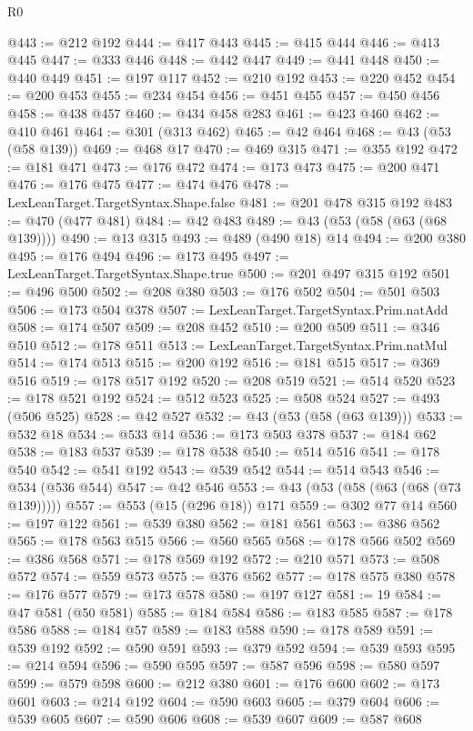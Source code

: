 \begin{lexlean}{R0}
\begin{coremodule}
@443 := @212 @192
@444 := @417 @443
@445 := @415 @444
@446 := @413 @445
@447 := @333 @446
@448 := @442 @447
@449 := @441 @448
@450 := @440 @449
@451 := @197 @117
@452 := @210 @192
@453 := @220 @452
@454 := @200 @453
@455 := @234 @454
@456 := @451 @455
@457 := @450 @456
@458 := @438 @457
@460 := @434 @458 @283
@461 := @423 @460
@462 := @410 @461
@464 := @301 (@313 @462)
@465 := @42 @464
@468 := @43 (@53 (@58 @139))
@469 := @468 @17
@470 := @469 @315
@471 := @355 @192
@472 := @181 @471
@473 := @176 @472
@474 := @173 @473
@475 := @200 @471
@476 := @176 @475
@477 := @474 @476
@478 := LexLeanTarget.TargetSyntax.Shape.false
@481 := @201 @478 @315 @192
@483 := @470 (@477 @481)
@484 := @42 @483
@489 := @43 (@53 (@58 (@63 (@68 @139))))
@490 := @13 @315
@493 := @489 (@490 @18) @14
@494 := @200 @380
@495 := @176 @494
@496 := @173 @495
@497 := LexLeanTarget.TargetSyntax.Shape.true
@500 := @201 @497 @315 @192
@501 := @496 @500
@502 := @208 @380
@503 := @176 @502
@504 := @501 @503
@506 := @173 @504 @378
@507 := LexLeanTarget.TargetSyntax.Prim.natAdd
@508 := @174 @507
@509 := @208 @452
@510 := @200 @509
@511 := @346 @510
@512 := @178 @511
@513 := LexLeanTarget.TargetSyntax.Prim.natMul
@514 := @174 @513
@515 := @200 @192
@516 := @181 @515
@517 := @369 @516
@519 := @178 @517 @192
@520 := @208 @519
@521 := @514 @520
@523 := @178 @521 @192
@524 := @512 @523
@525 := @508 @524
@527 := @493 (@506 @525)
@528 := @42 @527
@532 := @43 (@53 (@58 (@63 @139)))
@533 := @532 @18
@534 := @533 @14
@536 := @173 @503 @378
@537 := @184 @62
@538 := @183 @537
@539 := @178 @538
@540 := @514 @516
@541 := @178 @540
@542 := @541 @192
@543 := @539 @542
@544 := @514 @543
@546 := @534 (@536 @544)
@547 := @42 @546
@553 := @43 (@53 (@58 (@63 (@68 (@73 @139)))))
@557 := @553 (@15 (@296 @18)) @171
@559 := @302 @77 @14
@560 := @197 @122
@561 := @539 @380
@562 := @181 @561
@563 := @386 @562
@565 := @178 @563 @515
@566 := @560 @565
@568 := @178 @566 @502
@569 := @386 @568
@571 := @178 @569 @192
@572 := @210 @571
@573 := @508 @572
@574 := @559 @573
@575 := @376 @562
@577 := @178 @575 @380
@578 := @176 @577
@579 := @173 @578
@580 := @197 @127
@581 := 19
@584 := @47 @581 (@50 @581)
@585 := @184 @584
@586 := @183 @585
@587 := @178 @586
@588 := @184 @57
@589 := @183 @588
@590 := @178 @589
@591 := @539 @192
@592 := @590 @591
@593 := @379 @592
@594 := @539 @593
@595 := @214 @594
@596 := @590 @595
@597 := @587 @596
@598 := @580 @597
@599 := @579 @598
@600 := @212 @380
@601 := @176 @600
@602 := @173 @601
@603 := @214 @192
@604 := @590 @603
@605 := @379 @604
@606 := @539 @605
@607 := @590 @606
@608 := @539 @607
@609 := @587 @608

\end{coremodule}
\end{lexlean}
